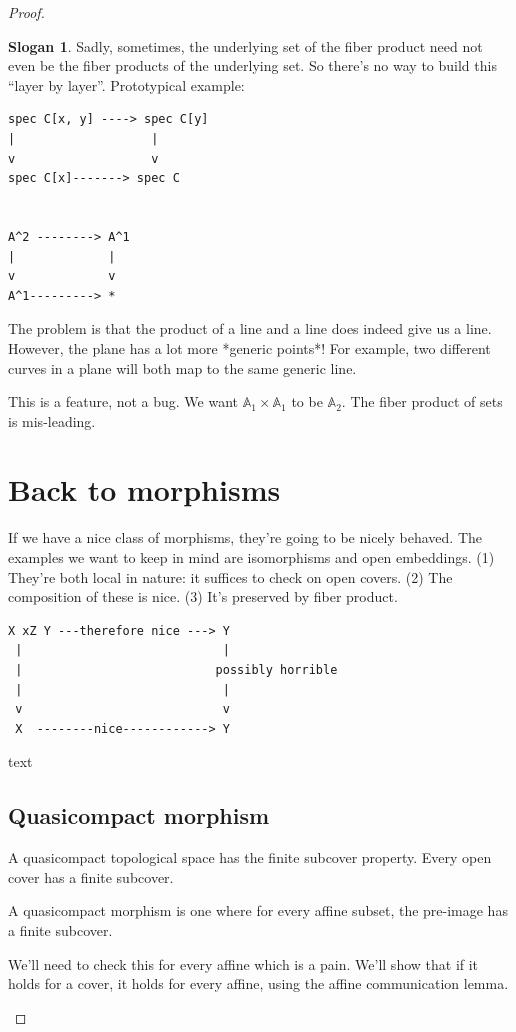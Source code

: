 \documentclass{book}
\newcommand{\A}{\ensuremath{\mathbb{A}}}
\theoremstyle{definition}
\newtheorem{slogan}[theorem]{Slogan}
\begin{document}
\begin{proof}
\begin{slogan}
Sadly, sometimes, the underlying set of the fiber product need not even be
the fiber products of the underlying set. So there's no way to build this
``layer by layer''. Prototypical example:


\begin{verbatim}
spec C[x, y] ----> spec C[y]
|                   |
v                   v
spec C[x]-------> spec C


A^2 --------> A^1
|             |
v             v
A^1---------> *
\end{verbatim}

The problem is that the product of a line and a line does indeed give us a line.
However, the plane has a lot more *generic points*! For example, two different
curves in a plane will both map to the same generic line.

This is a feature, not a bug. We want $\A_1 \times \A_1$ to be $\A_2$. The
fiber product of sets is mis-leading.


\section{Back to morphisms}

If we have a nice class of morphisms, they're going to be nicely behaved. The
examples we want to keep in mind are isomorphisms and open embeddings. (1)
They're both local in nature: it suffices to check on open covers. (2) The
composition of these is nice. (3) It's preserved by fiber product.

\begin{verbatim}
X xZ Y ---therefore nice ---> Y
 |                            |
 |                           possibly horrible
 |                            |
 v                            v
 X  --------nice------------> Y
\end{verbatim}{text}


\subsection{Quasicompact morphism}
A quasicompact topological space has the finite subcover property. Every open cover
has a finite subcover.

A quasicompact morphism is one where for every affine subset, the pre-image has
a finite subcover.

We'll need to check this for every affine which is a pain. We'll show that if it
holds for a cover, it holds for every affine, using the affine communication lemma.


\end{slogan}
\end{proof}
\end{document}
